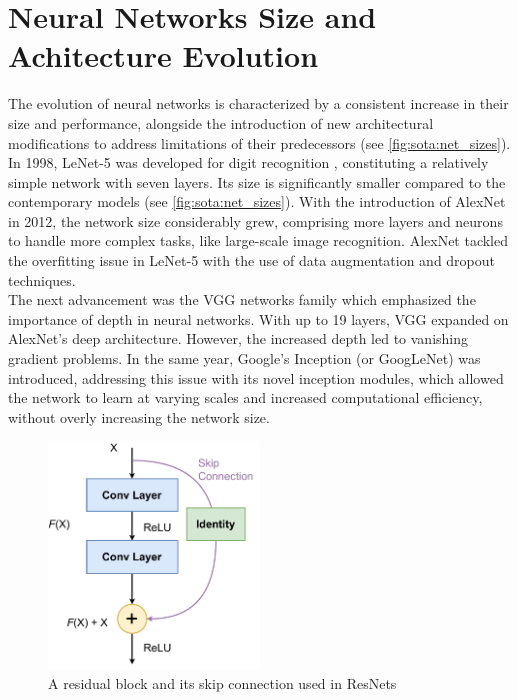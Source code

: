 \section{Neural Networks Size and Achitecture Evolution}\label{sec:sota:nn_evolution}

The evolution of neural networks is characterized by a consistent increase in
their size and performance, alongside the introduction of new architectural
modifications to address limitations of their predecessors (see
\cref{fig:sota:net_sizes}). In 1998, LeNet-5 was developed for digit recognition
\cite{DBLP:journals/pieee/LeCunBBH98}, constituting a relatively simple network
with seven layers. Its size is significantly smaller compared to the
contemporary models (see \cref{fig:sota:net_sizes}). With the introduction of
AlexNet \cite{DBLP:conf/nips/KrizhevskySH12} in 2012, the network size
considerably grew, comprising more layers and neurons to handle more complex
tasks, like large-scale image recognition. AlexNet tackled the overfitting issue
in LeNet-5 with the use of data augmentation and dropout techniques.\\


The next advancement was the VGG networks family
\cite{DBLP:journals/corr/SimonyanZ14a} %
which emphasized the importance of depth in neural networks. With up to 19
layers, VGG expanded on AlexNet's deep architecture. However, the increased
depth led to vanishing gradient problems. In the same year, Google's Inception
(or GoogLeNet) \cite{DBLP:conf/cvpr/SzegedyLJSRAEVR15} was introduced,
addressing this issue with its novel inception modules, which allowed the
network to learn at varying scales and increased computational efficiency,
without overly increasing the network size.\\

\begin{figure}[htbp]
    \centering
    \includegraphics[width=0.5\textwidth]{chapter_sota/assets/skip_connection.pdf}
    \caption{A residual block and its skip connection used in
    ResNets\cite{DBLP:conf/cvpr/HeZRS16}}
    \label{fig:sota:skip_connection}
\end{figure}

